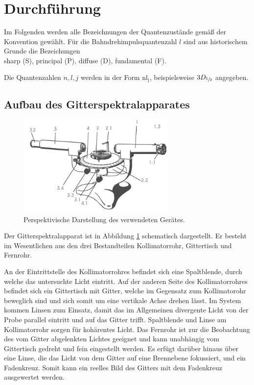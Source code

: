 \section{Durchf\"uhrung}
\label{sec:Durchfuehrung}
Im Folgenden werden alle Bezeichnungen der Quantenzustände gemäß der Konvention gewählt.
Für die Bahndrehimpulsquantenzahl $l$ sind aus historischem Grunde die Bezeichungen \\
sharp (S),
principal (P),
diffuse (D),
fundamental (F).

Die Quantenzahlen $n,l,j$ werden in der Form $\mathup{nl}_\mathup{j}$, beispielsweise $3D_{\sfrac{5}{2}}$ angegeben.
\subsection{Aufbau des Gitterspektralapparates}
\begin{figure}
	\centering
	\includegraphics[width=0.7\textwidth]{Bilder/Apparat.png}
	\caption{Perspektivische Darstellung des verwendeten Gerätes. \cite{skript}} 
	\label{fig:Gitterspektralapparat}
\end{figure}
Der Gitterspektralapparat ist in Abbildung \ref{fig:Gitterspektralapparat} schematisch dargestellt.
Er besteht im Wesentlichen aus den drei Bestandteilen Kollimatorrohr, Gittertisch und Fernrohr.

An der Eintrittstelle des Kollimatorrohres befindet sich eine Spaltblende, durch welche das untersuchte Licht eintritt.
Auf der anderen Seite des Kollimatorrohres befindet sich ein Gittertisch mit Gitter, welche im Gegensatz zum Kollimatorohr beweglich sind und sich somit um eine vertikale Achse drehen lässt. 
Im System kommen Linsen zum Einsatz, damit das im Allgemeinen divergente Licht von der Probe parallel eintritt und auf das Gitter trifft.
Spaltblende und Linse am Kollimatorrohr sorgen für kohärentes Licht.
Das Fernrohr ist zur die Beobachtung des vom Gitter abgelenkten Lichtes geeignet und kann unabhängig vom Gittertisch gedreht und fein eingestellt werden. 
Es erfügt darüber hinaus über eine Linse, die das Licht von dem Gitter auf eine Brennebene fokussiert, und ein Fadenkreuz.
Somit kann ein reelles Bild des Gitters mit dem Fadenkreuz ausgewertet werden.

